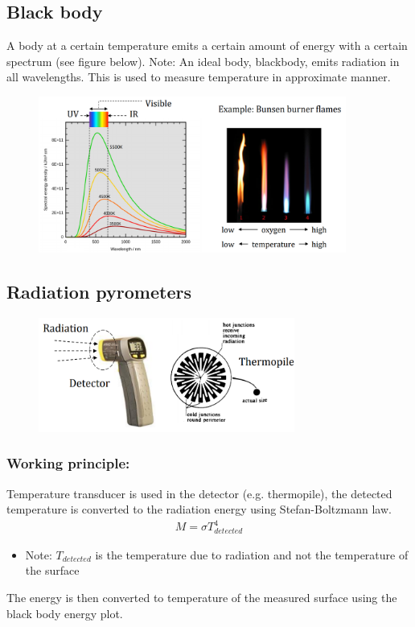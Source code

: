 \documentclass[class=report, crop=false, 12pt,a4paper]{standalone}
\begin{document}
\subsection{Black body}
A body at a certain temperature emits a certain amount of energy with a certain spectrum (see figure below). Note: An ideal body, blackbody, emits radiation in all wavelengths. This is used to measure temperature in approximate manner.
\begin{figure}[H]
  \centering
  \includegraphics[width = 0.9\textwidth]{../img/Mdiagram72.png}
\end{figure}
\subsection{Radiation pyrometers}
\begin{figure}[H]
  \centering
  \includegraphics[width = 0.75\textwidth]{../img/Mdiagram73.png}
\end{figure}
\subsubsection{Working principle:}
Temperature transducer is used in the detector (e.g. thermopile), the detected temperature is converted to the radiation energy using Stefan-Boltzmann law.
\begin{gather}
  M = \sigma T_{detected}^4
\end{gather}
\begin{itemize}
  \item Note: $T_{detected}$ is the  temperature due to radiation and not the temperature of the surface
\end{itemize}
The energy is then converted to temperature of the measured surface using the black body energy plot.
\end{document}
